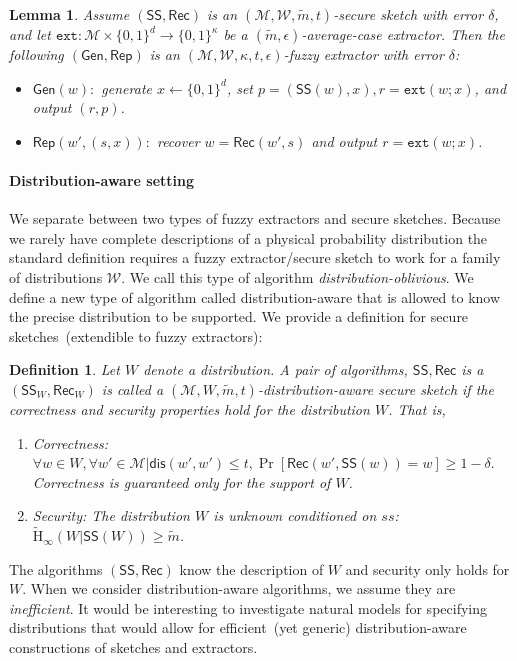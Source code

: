 \documentclass[11pt]{article}
\newcommand{\class}[1]{{\ensuremath{\mathsf{#1}}}}
\newcommand{\gen}{\ensuremath{\class{Gen}}\xspace}
\newcommand{\rep}{\ensuremath{\class{Rep}}\xspace}
\newcommand{\sketch}{\ensuremath{\class{SS}}\xspace}
\newcommand{\rec}{\ensuremath{\class{Rec}}\xspace}
\newcommand{\zo}{\ensuremath{\{0, 1\}}}
\newcommand{\dis}{\ensuremath{\mathsf{dis}}}
\newcommand{\Hav}{\tilde{\mathrm{H}}_\infty}
\newcommand{\ext}{\ensuremath{\mathtt{ext}}}
\newtheorem{lemma}[theorem]{Lemma}
\newtheorem{definition}[theorem]{Definition}
\begin{document}
\begin{lemma}
\label{lem:fuzzy ext construction}
Assume $(\sketch, \rec)$ is an $(\mathcal{M}, \mathcal{W}, \tilde{m}, t)$-secure sketch with error $\delta$, and let $\ext:\mathcal{M}\times \zo^d \rightarrow \zo^\kappa$ be a $(\tilde{m}, \epsilon)$-average-case extractor.  Then the following $(\gen, \rep)$ is an $(\mathcal{M}, \mathcal{W}, \kappa, t, \epsilon)$-fuzzy extractor with error $\delta$:
\begin{itemize}
\item $\gen(w):$ generate $x\leftarrow \zo^d$, set $p=(\sketch(w), x), r=\ext(w;x)$, and output $(r,p)$.
\item $\rep(w', (s, x)):$ recover $w=\rec(w',s)$ and output $r=\ext(w;x)$.
\end{itemize}
\end{lemma}

\paragraph{Distribution-aware setting}
We separate between two types of fuzzy extractors and secure sketches.  Because we rarely have complete descriptions of a physical probability distribution the standard definition requires a fuzzy extractor/secure sketch to work for a family of distributions $\mathcal{W}$.  We call this type of algorithm \emph{distribution-oblivious}.  We define a new type of algorithm called distribution-aware that is allowed to know the precise distribution to be supported.  We provide a definition for secure sketches~(extendible to fuzzy extractors):

\begin{definition}
Let $W$ denote a distribution.  A pair of algorithms, $\sketch, \rec$ is a $(\sketch_W, \rec_W)$ is called a $(\mathcal{M}, W, \tilde{m}, t)$-\emph{distribution-aware secure sketch} if the correctness and security properties hold for the distribution $W$.  That is, 
\begin{enumerate}
\item \emph{Correctness:} 
$
\forall w\in W, \forall w' \in\mathcal{M}| \dis(w',w')\le t, \Pr[\rec(w',\sketch(w))=w]\ge 1-\delta.$
Correctness is guaranteed only for the support of $W$.
\item \emph{Security:} The distribution $W$ is unknown conditioned on $ss$: $\Hav(W|\sketch(W))\geq \tilde{m}$.
\end{enumerate}
\end{definition}
The algorithms $(\sketch, \rec)$ know the description of $W$ and security only holds for $W$.  When we consider distribution-aware algorithms, we assume they are \emph{inefficient}.  It would be interesting to investigate natural models for specifying distributions that would allow for efficient~(yet generic) distribution-aware constructions of sketches and extractors.
\end{document}
